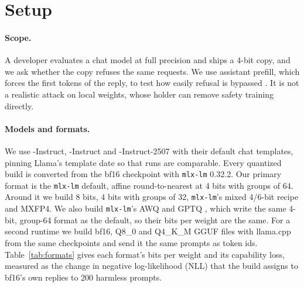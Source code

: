 \section{Setup}
\label{sec:setup}

\paragraph{Scope.}
A developer evaluates a chat model at full precision and ships a 4-bit copy, and we ask whether the copy refuses the same requests. We use assistant prefill, which forces the first tokens of the reply, to test how easily refusal is bypassed \citep{qi2024shallow}. It is not a realistic attack on local weights, whose holder can remove safety training directly.

\paragraph{Models and formats.}
We use \qwen-Instruct, \llama-Instruct and \qwenthree-Instruct-2507 with their default chat templates, pinning Llama's template date so that runs are comparable. Every quantized build is converted from the bf16 checkpoint with \texttt{mlx-lm} 0.32.2. Our primary format is the \texttt{mlx-lm} default, affine round-to-nearest at 4 bits with groups of 64. Around it we build 8 bits, 4 bits with groups of 32, \texttt{mlx-lm}'s mixed 4/6-bit recipe and MXFP4. We also build \texttt{mlx-lm}'s AWQ and GPTQ \citep{lin2024awq, frantar2023gptq}, which write the same 4-bit, group-64 format as the default, so their bits per weight are the same. For a second runtime we build bf16, Q8\_0 and Q4\_K\_M GGUF files with llama.cpp from the same checkpoints and send it the same prompts as token ids. Table~\ref{tab:formats} gives each format's bits per weight and its capability loss, measured as the change in negative log-likelihood (NLL) that the build assigns to bf16's own replies to 200 harmless prompts.

